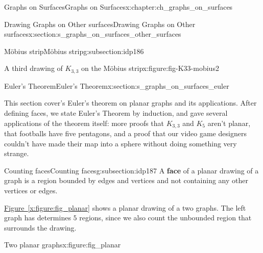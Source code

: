 \documentclass[oneside,10pt,]{book}
\newcommand{\xreffont}{\relax}
\newcommand{\terminology}[1]{\textbf{#1}}
\numberwithin{equation}{section}
\begin{document}
\begin{chapterptx}{Graphs on Surfaces}{}{Graphs on Surfaces}{}{}{x:chapter:ch_graphs_on_surfaces}
\begin{sectionptx}{Drawing Graphs on Other surfaces}{}{Drawing Graphs on Other surfaces}{}{}{x:section:s_graphs_on_surfaces_other_surfaces}
\begin{subsectionptx}{Möbius strip}{}{Möbius strip}{}{}{g:subsection:idp186}
\begin{figureptx}{A third drawing of \(K_{3,3}\) on the Möbius strip}{x:figure:fig-K33-mobius2}{}
\begin{image}{0}{1}{0}
{
}%
\end{image}%
\tcblower
\end{figureptx}%
\end{subsectionptx}
\end{sectionptx}
%
%
\typeout{************************************************}
\typeout{************************************************}
%
\begin{sectionptx}{Euler's Theorem}{}{Euler's Theorem}{}{}{x:section:s_graphs_on_surfaces_euler}
\begin{introduction}{}%
This section cover's Euler's theorem on planar graphs and its applications. After defining faces, we state Euler's Theorem by induction, and gave several applications of the theorem itself: more proofs that \(K_{3,3}\) and \(K_5\) aren't planar, that footballs have five pentagons, and a proof that our video game designers couldn't have made their map into a sphere without doing something very strange.%
\end{introduction}%
%
%
\typeout{************************************************}
\typeout{************************************************}
%
\begin{subsectionptx}{Counting faces}{}{Counting faces}{}{}{g:subsection:idp187}
A \terminology{face} of a planar drawing of a graph is a region bounded by edges and vertices and not containing any other vertices or edges.%
\par
\hyperref[x:figure:fig_planar]{Figure~{\xreffont\ref{x:figure:fig_planar}}} shows a planar drawing of a two graphs. The left graph has determines \(5\) regions, since we also count the unbounded region that surrounds the drawing.%
\begin{figureptx}{Two planar graphs}{x:figure:fig_planar}{}%
\begin{image}{0}{1}{0}%
\resizebox{\linewidth}{!}{%
\begin{tikzpicture}



\end{tikzpicture}}
\end{image}
\end{figureptx}
\end{subsectionptx}
\end{sectionptx}
\end{chapterptx}
\end{document}
